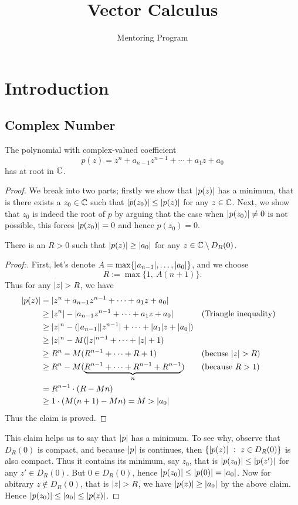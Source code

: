

\title{Vector Calculus}
\author{Mentoring Program}



\chapter{Introduction}
\section{Complex Number}


\begin{theorem}
  The polynomial with complex-valued coefficient
  \[p(z)=z^n+a_{n-1}z^{n-1}+\cdots+a_1z+a_0\]
  has at root in $\C$.
\end{theorem}
\begin{proof}
  We break into two parts; firstly we show that $\lvert p(z)\rvert$
  has a minimum, that is there exists a $z_0\in\C$ such that
  $\lvert p(z_0)\rvert\leq\lvert p(z)\rvert$ for any $z\in\C$.
  Next, we show that $z_0$ is indeed the root of $p$ by arguing
  that the case when $\lvert p(z_0)\rvert\neq 0$ is not possible, this
  forces $\lvert p(z_0)\rvert=0$ and hence $p(z_0)=0$.

  \vspace{0.3cm}
  \begin{claim}
    There is an $R>0$ such that $\lvert p(z)\rvert\geq\lvert a_0\rvert$ for any 
    $z\in\C\setminus D_R(0)$.
  \end{claim}
  \begin{proof}[Proof:]
    First, let's denote $A=\max\{\lvert a_{n-1}\rvert, \dots, \lvert a_0\rvert\}$,
    and we choose
    \[R:=\max\{1,~ A(n+1)\}.\]
    Thus for any $\lvert z\rvert>R$, we have
    \begin{align*}
      \lvert p(z)\rvert
      &=\lvert z^n+a_{n-1}z^{n-1}+\cdots+a_1z+a_0\rvert\\
      &\geq \lvert z^n\rvert-\lvert a_{n-1}z^{n-1}+\cdots+a_1z+a_0\rvert
      &&(\text{Triangle inequality})\\
      &\geq \lvert z\rvert^n-(\lvert a_{n-1}\rvert\lvert z^{n-1}\rvert+\cdots+\lvert a_1\rvert z+\lvert a_0\rvert)\\
      &\geq \lvert z\rvert^n-M(\lvert z\rvert^{n-1}+\cdots+\lvert z\rvert+1)\\
      &\geq R^n-M(R^{n-1}+\cdots+R+1)
      &&(\text{becuse }\lvert z\rvert>R)\\
      &\geq R^n-M(\underbrace{R^{n-1}+\cdots+R^{n-1}+R^{n-1}}_{n})
      &&(\text{because }R>1)\\
      &=R^{n-1}\cdot(R-Mn)\\
      &\geq 1\cdot(M(n+1)-Mn)=M>\lvert a_0\rvert
    \end{align*}
    Thus the claim is proved.
  \end{proof}
  This claim helps us to say that $\lvert p\rvert$ has a minimum. To see why,
  observe that $D_R(0)$ is compact, and because $\lvert p\rvert$ is 
  continues, then $\{\lvert p(z)\rvert~:~ z\in D_R(0)\}$ is also compact. Thus
  it contains its minimum, say $z_0$,  that is 
  $\lvert p(z_0)\rvert\leq\lvert p(z')\rvert$ for any $z'\in D_R(0)$.
  But $0\in D_R(0)$, hence $\lvert p(z_0)\rvert\leq\lvert p(0)\rvert=\lvert a_0\rvert$.
  Now for abitrary $z\notin D_R(0)$, that is $\lvert z\rvert>R$, we have 
  $\lvert p(z)\rvert\geq\lvert a_0\rvert$ by the above claim. Hence
  $\lvert p(z_0)\rvert\leq\lvert a_0\rvert\leq\lvert p(z)\rvert$.


\end{proof}
